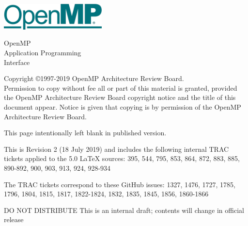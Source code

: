 
  \begin{titlepage}
    \begin{flushleft}
     \hspace{-6em} \includegraphics[width=0.4\textwidth]{openmp-logo.png}
    \end{flushleft}

    \begin{adjustwidth}{-0.75in}{0in}
    \begin{center}
      \Huge
      \textsf{OpenMP\\Application Programming\\Interface}

      \vspace{0.5in}\textsf{    }\vspace{-0.7in}
      \normalsize

      \vspace{1.0in}

      \textbf{\ompversion{}}
    \end{center}
    \end{adjustwidth}

    \vspace{3.0in}

\begin{adjustwidth}{0pt}{1em}\setlength{\parskip}{0.25\baselineskip}%
Copyright \copyright 1997-2019 OpenMP Architecture Review Board.\\
Permission to copy without fee all or part of this material is granted,
provided the OpenMP Architecture Review Board copyright notice and
the title of this document appear. Notice is given that copying is by
permission of the OpenMP Architecture Review Board.\end{adjustwidth}

  \end{titlepage}


\clearpage
\thispagestyle{empty}
\phantom{a}
This page intentionally left blank in published version.

This is Revision 2 (18 July 2019) and includes the following internal 
TRAC tickets applied to the 5.0 LaTeX sources: 395, 544, 795, 853, 
864, 872, 883, 885, 890-892, 900, 903, 913, 924, 928-934

The TRAC tickets correspond to these GitHub issues: 1327, 1476, 1727, 1785, 
1796, 1804, 1815, 1817, 1822-1824, 1832, 1835, 1845, 1856, 1860-1866

DO NOT DISTRIBUTE
This is an internal draft; contents will change in official release

\vfill

